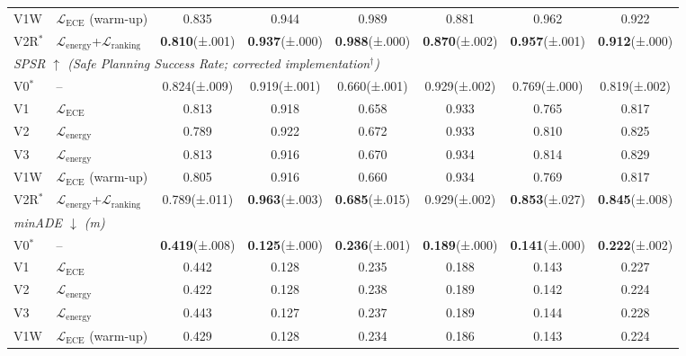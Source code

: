 \begin{table}[t]
{\begin{tabular}{l l c c c c c c}
V1W     & $\mathcal{L}_{\text{ECE}}$ (warm-up)
  & 0.835 & 0.944 & 0.989 & 0.881 & 0.962 & 0.922 \\
V2R$^*$ & $\mathcal{L}_{\text{energy}}$+$\mathcal{L}_{\text{ranking}}$
  & \textbf{0.810}\scriptsize{(±.001)} & \textbf{0.937}\scriptsize{(±.000)}
  & \textbf{0.988}\scriptsize{(±.000)} & \textbf{0.870}\scriptsize{(±.002)}
  & \textbf{0.957}\scriptsize{(±.001)} & \textbf{0.912}\scriptsize{(±.000)} \\
\midrule
\multicolumn{8}{l}{\textit{SPSR $\uparrow$ (Safe Planning Success Rate; corrected implementation$^\dagger$)}} \\
V0$^*$  & --
  & 0.824\scriptsize{(±.009)} & 0.919\scriptsize{(±.001)}
  & 0.660\scriptsize{(±.001)} & 0.929\scriptsize{(±.002)}
  & 0.769\scriptsize{(±.000)} & 0.819\scriptsize{(±.002)} \\
V1      & $\mathcal{L}_{\text{ECE}}$
  & 0.813 & 0.918 & 0.658 & 0.933 & 0.765 & 0.817 \\
V2      & $\mathcal{L}_{\text{energy}}$
  & 0.789 & 0.922 & 0.672 & 0.933 & 0.810 & 0.825 \\
V3      & $\mathcal{L}_{\text{energy}}$
  & 0.813 & 0.916 & 0.670 & 0.934 & 0.814 & 0.829 \\
V1W     & $\mathcal{L}_{\text{ECE}}$ (warm-up)
  & 0.805 & 0.916 & 0.660 & 0.934 & 0.769 & 0.817 \\
V2R$^*$ & $\mathcal{L}_{\text{energy}}$+$\mathcal{L}_{\text{ranking}}$
  & 0.789\scriptsize{(±.011)} & \textbf{0.963}\scriptsize{(±.003)}
  & \textbf{0.685}\scriptsize{(±.015)} & 0.929\scriptsize{(±.002)}
  & \textbf{0.853}\scriptsize{(±.027)} & \textbf{0.845}\scriptsize{(±.008)} \\
\midrule
\multicolumn{8}{l}{\textit{minADE $\downarrow$ (m)}} \\
V0$^*$  & --
  & \textbf{0.419}\scriptsize{(±.008)} & \textbf{0.125}\scriptsize{(±.000)}
  & \textbf{0.236}\scriptsize{(±.001)} & \textbf{0.189}\scriptsize{(±.000)}
  & \textbf{0.141}\scriptsize{(±.000)} & \textbf{0.222}\scriptsize{(±.002)} \\
V1      & $\mathcal{L}_{\text{ECE}}$
  & 0.442 & 0.128 & 0.235 & 0.188 & 0.143 & 0.227 \\
V2      & $\mathcal{L}_{\text{energy}}$
  & 0.422 & 0.128 & 0.238 & 0.189 & 0.142 & 0.224 \\
V3      & $\mathcal{L}_{\text{energy}}$
  & 0.443 & 0.127 & 0.237 & 0.189 & 0.144 & 0.228 \\
V1W     & $\mathcal{L}_{\text{ECE}}$ (warm-up)
  & 0.429 & 0.128 & 0.234 & 0.186 & 0.143 & 0.224 \\

\end{tabular}}
\end{table}
